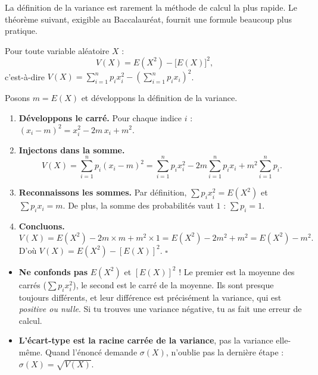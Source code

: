 \documentclass[11pt]{article}
\begin{document}
La définition de la variance est rarement la méthode de calcul la plus rapide. Le théorème suivant, exigible au Baccalauréat, fournit une formule beaucoup plus pratique.

\begin{propriete}
Pour toute variable aléatoire $X$ :
\[ V(X) = E(X^2) - \bigl[E(X)\bigr]^2, \]
c'est-à-dire $V(X) = \displaystyle\sum_{i=1}^{n} p_i x_i^2 - \left(\sum_{i=1}^{n} p_i x_i\right)^2$.
\end{propriete}

\begin{experience}
Posons $m = E(X)$ et développons la définition de la variance.
\begin{enumerate}
\item \textbf{Développons le carré.} Pour chaque indice $i$ : $(x_i - m)^2 = x_i^2 - 2m\,x_i + m^2$.
\item \textbf{Injectons dans la somme.}
\[ V(X) = \sum_{i=1}^{n} p_i (x_i - m)^2 = \sum_{i=1}^{n} p_i x_i^2 - 2m\sum_{i=1}^{n} p_i x_i + m^2 \sum_{i=1}^{n} p_i. \]
\item \textbf{Reconnaissons les sommes.} Par définition, $\sum p_i x_i^2 = E(X^2)$ et $\sum p_i x_i = m$. De plus, la somme des probabilités vaut $1$ : $\sum p_i = 1$.
\item \textbf{Concluons.}
\[ V(X) = E(X^2) - 2m \times m + m^2 \times 1 = E(X^2) - 2m^2 + m^2 = E(X^2) - m^2. \]
D'où $V(X) = E(X^2) - [E(X)]^2$. $\square$
\end{enumerate}
\end{experience}

\begin{attention}
\begin{itemize}
\item \textbf{Ne confonds pas} $E(X^2)$ et $[E(X)]^2$ ! Le premier est la moyenne des carrés ($\sum p_i x_i^2$), le second est le carré de la moyenne. Ils sont presque toujours différents, et leur différence est précisément la variance, qui est \emph{positive ou nulle}. Si tu trouves une variance négative, tu as fait une erreur de calcul.
\item \textbf{L'écart-type est la racine carrée de la variance}, pas la variance elle-même. Quand l'énoncé demande $\sigma(X)$, n'oublie pas la dernière étape : $\sigma(X) = \sqrt{V(X)}$.
\end{itemize}
\end{attention}
\end{document}
